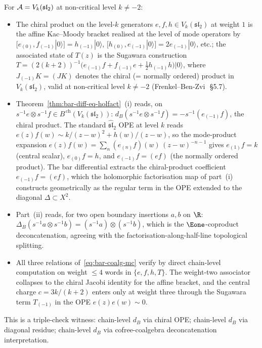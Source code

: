 \begin{remark}[Concrete witness on $\cA=V_k(\mathfrak{sl}_2)$]
\label{rem:bar-diff-witness-vk-sl2}%
For $\cA=V_k(\mathfrak{sl}_2)$ at non-critical level $k\neq -2$:
\begin{itemize}
\item The chiral product on the level-$k$ generators
$e,f,h\in V_k(\mathfrak{sl}_2)$ at weight $1$ is the affine
Kac--Moody bracket realised at the level of mode operators by
$[e_{(0)},f_{(-1)}|0\rangle]=h_{(-1)}|0\rangle$,
$[h_{(0)},e_{(-1)}|0\rangle]=2e_{(-1)}|0\rangle$, etc.;
the associated state of $T(z)$ is the Sugawara construction
$T = (2(k+2))^{-1}\bigl(e_{(-1)}f + f_{(-1)}e + \tfrac12 h_{(-1)}h\bigr)
|0\rangle$,
where $J_{(-1)}K = (JK)$ denotes the chiral (= normally ordered) product
in $V_k(\mathfrak{sl}_2)$, valid at non-critical level $k\neq -2$
(Frenkel--Ben-Zvi~\cite{FBZ04}\,\S 5.7).
\item Theorem~\ref{thm:bar-diff-eq-holfact}~(i) reads, on
$s^{-1}e\otimes s^{-1}f\in B^{\,\mathrm{ch}}(V_k(\mathfrak{sl}_2))$:
$d_B(s^{-1}e\otimes s^{-1}f) = -s^{-1}(e_{(-1)}f)$, the chiral
product. The standard $\hat{\mathfrak{sl}}_2$ OPE at level $k$ reads
$e(z)f(w) \sim k/(z-w)^2 + h(w)/(z-w)$, so the
mode-product expansion $e(z)f(w) = \sum_n (e_{(n)}f)(w)\,(z-w)^{-n-1}$
gives $e_{(1)}f = k$ (central scalar), $e_{(0)}f = h$, and
$e_{(-1)}f = (ef)$ (the normally ordered product). The bar
differential extracts the chiral-product coefficient
$e_{(-1)}f = (ef)$, which the holomorphic factorisation map of
part~(i) constructs geometrically as the regular term in the OPE
extended to the diagonal $\Delta\subset X^2$.
\item Part~(ii) reads, for two open boundary insertions $a,b$ on
$\R$: $\Delta_B(s^{-1}a\otimes s^{-1}b)=(s^{-1}a)\otimes(s^{-1}b)$,
which is the $\Eone$-coproduct deconcatenation, agreeing with the
factorisation-along-half-line topological splitting.
\item All three relations of~\eqref{eq:bar-coalg-mc} verify
by direct chain-level computation on weight $\leq 4$ words in
$\{e,f,h,T\}$. The weight-two associator collapses to the chiral
Jacobi identity for the affine bracket, and the central charge
$c=3k/(k+2)$ enters only at weight three through the
Sugawara term $T_{(-1)}$ in the OPE $e(z)e(w)\sim 0$.
\end{itemize}
This is a triple-check witness: chain-level $d_B$ via
chiral OPE; chain-level $d_B$ via diagonal residue; chain-level
$d_B$ via cofree-coalgebra deconcatenation interpretation.
\end{remark}

